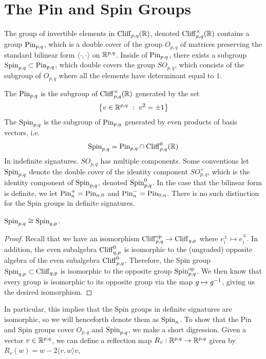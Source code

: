 %
\section{The Pin and Spin Groups}
%
The group of invertible elements in $\operatorname{Cliff}_{p,q}(\mathbb{R})$, denoted
$\operatorname{Cliff}_{p,q}^\times(\mathbb{R})$ contains a group $\mathrm{Pin}_{p,q}$, which is a double
cover of the group $O_{p,q}$ of matrices preserving the standard bilinear
form $\langle \cdot,\cdot \rangle$ on $\mathbb{R}^{p,q}$. Inside of $\mathrm{Pin}_{p,q}$,
there exists a subgroup $\mathrm{Spin}_{p,q} \subset \mathrm{Pin}_{p,q}$, which double covers
the group $SO_{p,q}$, which consists of the subgroup of $O_{p,q}$ where
all the elements have determinant equal to $1$.
%
\begin{defn}
The  $\mathrm{Pin}_{p,q}$ is the subgroup of $\operatorname{Cliff}_{p,q}^\times(\mathbb{R})$
generated by the set
\[
\left\lbrace v \in \mathbb{R}^{p,q} ~:~ v^2 = \pm 1 \right\rbrace
\]
The  $\mathrm{Spin}_{p,q}$ is the subgroup of $\mathrm{Pin}_{p,q}$ generated by even
products of basis vectors, i.e.
\[
\mathrm{Spin}_{p,q} = \mathrm{Pin}_{p,q} \cap \operatorname{Cliff}_{p,q}^0(\mathbb{R})
\]
In indefinite signatures. $SO_{p,q}$ has multiple components. Some conventions
let $\mathrm{Spin}_{p,q}$ denote the double cover of the identity component $SO_{p,q}^+$,
which is the identity component of $\mathrm{Spin}_{p,q}$, denoted $\mathrm{Spin}^0_{p,q}$.
In the case that the bilinear form is definite, we let $\mathrm{Pin}_n^+ = \mathrm{Pin}_{n,0}$
and $\mathrm{Pin}_n^- = \mathrm{Pin}_{0,n}$. There is no such distinction for the Spin groups
in definite signatures.
\end{defn}
%
\begin{thm}
$\mathrm{Spin}_{p,q} \cong \mathrm{Spin}_{q,p}$.
\end{thm}
%
\begin{proof}
Recall that we have an isomorphism $\operatorname{Cliff}_{p,q}^{\text{op}} \to \operatorname{Cliff}_{q,p}$
where $e_i^\pm \mapsto e_i^\mp$. In addition, the even subalgebra $\operatorname{Cliff}_{q,p}^0$
is isomorphic to the (ungraded) opposite algebra of the even subalgebra
$\operatorname{Cliff}_{p,q}^0$. Therefore, the Spin group $\mathrm{Spin}_{q,p} \subset \operatorname{Cliff}_{q,p}$
is isomorphic to the opposite group $\mathrm{Spin}_{p,q}^\text{op}$. We then know
that every group is isomorphic to its opposite group via the map $g \mapsto g^{-1}$,
giving us the desired isomorphism.
\end{proof}
%
%
In particular, this implies that the Spin groups in definite signatures are
isomorphic, so we will henceforth denote them as $\mathrm{Spin}_n$.
%
To show that the Pin and Spin groups cover $O_{p,q}$ and $\mathrm{Spin}_{p,q}$, we make
a short digression. Given a vector $v \in \mathbb{R}^{p,q}$, we can define a reflection
map $R_v : \mathbb{R}^{p,q} \to \mathbb{R}^{p,q}$ given by $R_v(w) = w - 2\langle v,w \rangle v$,
